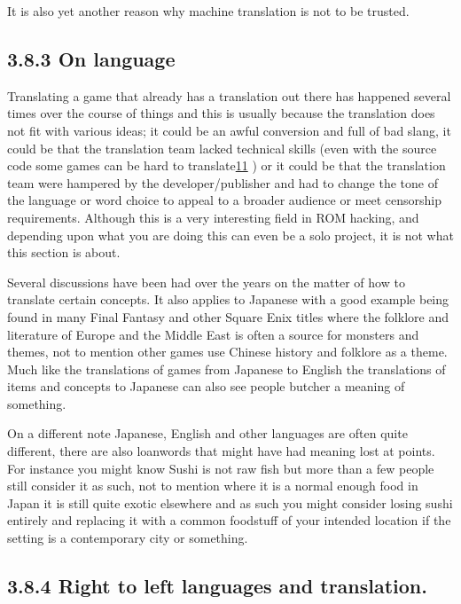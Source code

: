 \documentclass[
]{book}
\begin{document}
It is also yet another reason why machine translation is not to be trusted.

\hypertarget{on-language}{%
\subsection{3.8.3 On language}\label{on-language}}

Translating a game that already has a translation out there has happened several times over the course of things and this is usually because the translation does not fit with various ideas; it could be an awful conversion and full of bad slang, it could be that the translation team lacked technical skills (even with the source code some games can be hard to translate\href{romhacking202012.html\#fn11x0}{11} ) or it could be that the translation team were hampered by the developer/publisher and had to change the tone of the language or word choice to appeal to a broader audience or meet censorship requirements. Although this is a very interesting field in ROM hacking, and depending upon what you are doing this can even be a solo project, it is not what this section is about.

Several discussions have been had over the years on the matter of how to translate certain concepts. It also applies to Japanese with a good example being found in many Final Fantasy and other Square Enix titles where the folklore and literature of Europe and the Middle East is often a source for monsters and themes, not to mention other games use Chinese history and folklore as a theme. Much like the translations of games from Japanese to English the translations of items and concepts to Japanese can also see people butcher a meaning of something.

On a different note Japanese, English and other languages are often quite different, there are also loanwords that might have had meaning lost at points. For instance you might know Sushi is not raw fish but more than a few people still consider it as such, not to mention where it is a normal enough food in Japan it is still quite exotic elsewhere and as such you might consider losing sushi entirely and replacing it with a common foodstuff of your intended location if the setting is a contemporary city or something.

\hypertarget{right-to-left-languages-and-translation.}{%
\subsection{3.8.4 Right to left languages and translation.}\label{right-to-left-languages-and-translation.}}
\end{document}

